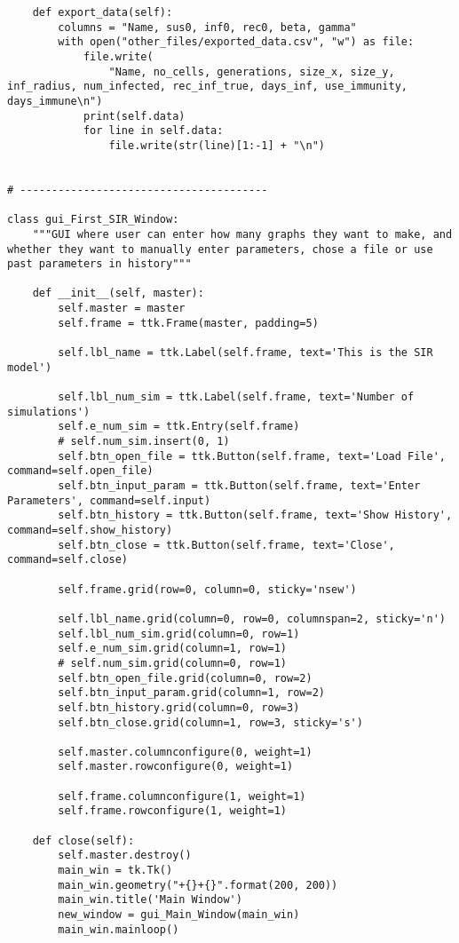 \documentclass[11pt, a4paper]{article}
\begin{document}
\begin{lstlisting}
    def export_data(self):
        columns = "Name, sus0, inf0, rec0, beta, gamma"
        with open("other_files/exported_data.csv", "w") as file:
            file.write(
                "Name, no_cells, generations, size_x, size_y, inf_radius, num_infected, rec_inf_true, days_inf, use_immunity, days_immune\n")
            print(self.data)
            for line in self.data:
                file.write(str(line)[1:-1] + "\n")


# ---------------------------------------

class gui_First_SIR_Window:
    """GUI where user can enter how many graphs they want to make, and whether they want to manually enter parameters, chose a file or use past parameters in history"""

    def __init__(self, master):
        self.master = master
        self.frame = ttk.Frame(master, padding=5)

        self.lbl_name = ttk.Label(self.frame, text='This is the SIR model')

        self.lbl_num_sim = ttk.Label(self.frame, text='Number of simulations')
        self.e_num_sim = ttk.Entry(self.frame)
        # self.num_sim.insert(0, 1)
        self.btn_open_file = ttk.Button(self.frame, text='Load File', command=self.open_file)
        self.btn_input_param = ttk.Button(self.frame, text='Enter Parameters', command=self.input)
        self.btn_history = ttk.Button(self.frame, text='Show History', command=self.show_history)
        self.btn_close = ttk.Button(self.frame, text='Close', command=self.close)

        self.frame.grid(row=0, column=0, sticky='nsew')

        self.lbl_name.grid(column=0, row=0, columnspan=2, sticky='n')
        self.lbl_num_sim.grid(column=0, row=1)
        self.e_num_sim.grid(column=1, row=1)
        # self.num_sim.grid(column=0, row=1)
        self.btn_open_file.grid(column=0, row=2)
        self.btn_input_param.grid(column=1, row=2)
        self.btn_history.grid(column=0, row=3)
        self.btn_close.grid(column=1, row=3, sticky='s')

        self.master.columnconfigure(0, weight=1)
        self.master.rowconfigure(0, weight=1)

        self.frame.columnconfigure(1, weight=1)
        self.frame.rowconfigure(1, weight=1)

    def close(self):
        self.master.destroy()
        main_win = tk.Tk()
        main_win.geometry("+{}+{}".format(200, 200))
        main_win.title('Main Window')
        new_window = gui_Main_Window(main_win)
        main_win.mainloop()


\end{lstlisting}
\end{document}
